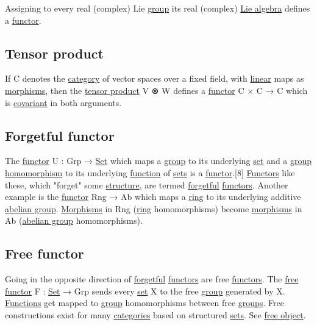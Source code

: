 \documentclass[11pt]{article}
\begin{document}
Assigning to every real (complex) Lie \hyperref[org9ef38ed]{group} its real (complex) \hyperref[org02864be]{Lie algebra} defines a \hyperref[org6073683]{functor}.\\

\subsection{\label{orgdb0e4bc}Tensor product}
\label{sec:orgd8eaa0e}

If C denotes the \hyperref[org3e3a79b]{category} of vector spaces over a fixed field, with \hyperref[orgb55e183]{linear} maps as \hyperref[org8ed0ce8]{morphisms}, then the \hyperref[orgdb0e4bc]{tensor product} V ⊗ W defines a \hyperref[org6073683]{functor} C × C → C which is \hyperref[orgf529c7b]{covariant} in both arguments.\\

\subsection{\label{org2d6f451}Forgetful functor}
\label{sec:orgef2ba93}

The \hyperref[org6073683]{functor} U : Grp → \hyperref[orgbed80ba]{Set} which maps a \hyperref[org9ef38ed]{group} to its underlying \hyperref[orgbed80ba]{set} and a \hyperref[org9ef38ed]{group} \hyperref[org01da5b8]{homomorphism} to its underlying \hyperref[orgeb5cddb]{function} of \hyperref[org4e7443a]{sets} is a \hyperref[org6073683]{functor}.[8] \hyperref[org6c3c2a6]{Functors} like these, which "forget" some \hyperref[org93ee82c]{structure}, are termed \hyperref[orga913e66]{forgetful} \hyperref[org6c3c2a6]{functors}. Another example is the \hyperref[org6073683]{functor} Rng → Ab which maps a \hyperref[org3db5758]{ring} to its underlying additive \hyperref[org079b4e5]{abelian group}. \hyperref[org8ed0ce8]{Morphisms} in Rng (\hyperref[org3db5758]{ring} homomorphisms) become \hyperref[org8ed0ce8]{morphisms} in Ab (\hyperref[org079b4e5]{abelian group} homomorphisms).\\

\subsection{\label{org80fbd93}Free functor}
\label{sec:org1d1f3be}

Going in the opposite direction of \hyperref[orga913e66]{forgetful} \hyperref[org6c3c2a6]{functors} are free \hyperref[org6c3c2a6]{functors}. The \hyperref[org80fbd93]{free functor} F : \hyperref[orgbed80ba]{Set} → Grp sends every \hyperref[orgbed80ba]{set} X to the free \hyperref[org9ef38ed]{group} generated by X. \hyperref[org66c5288]{Functions} get mapped to \hyperref[org9ef38ed]{group} homomorphisms between free \hyperref[org7292335]{groups}. Free constructions exist for many \hyperref[org43ea200]{categories} based on structured \hyperref[org4e7443a]{sets}. See \hyperref[orge73011b]{free object}.\\
\end{document}
